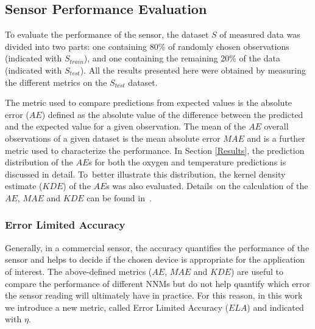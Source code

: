 \documentclass[sensors,article,accept,moreauthors,pdftex,10pt,a4paper]{Definitions/mdpi}
\theoremstyle{definition}
\begin{document}
\subsection{Sensor Performance Evaluation}

To evaluate the performance of the sensor, the dataset $S$ of measured data was divided into two parts: one containing 80\% of randomly chosen observations (indicated with $S_{train}$), and one containing the remaining 20\% of the data (indicated with $S_{test}$). All the results presented here were obtained by measuring the different metrics on the $S_{test}$ dataset.

The metric used to compare predictions from expected values is the absolute error ($AE$) defined as the absolute value of the difference between the predicted and the expected value for a given observation. 
The mean of the $AE$ overall observations of a given dataset is the mean absolute error $MAE$ and is a further metric used to characterize the performance.
In Section \ref{Results}, the prediction distribution of the $AE$s for both the oxygen and temperature predictions is  discussed in detail. To~better illustrate this distribution, the kernel density estimate ($KDE$) of the $AE$s was also evaluated. Details~on the calculation of the $AE$, $MAE$ and $KDE$ can be found in~\cite{Michelucci2019_2}.


\subsubsection{Error Limited Accuracy}
\label{sektion:ela}

Generally, in a commercial sensor, the accuracy quantifies the performance of the sensor and helps to decide if the chosen device is appropriate for the application of interest. The above-defined metrics ($AE$, $MAE$ and $KDE$) are useful to compare the performance of different NNMs but do not help quantify which error the sensor reading will ultimately have in practice.
For this reason, in this work we introduce a new metric, called Error Limited Accuracy ($ELA$) and indicated with $\eta$.
\end{document}
